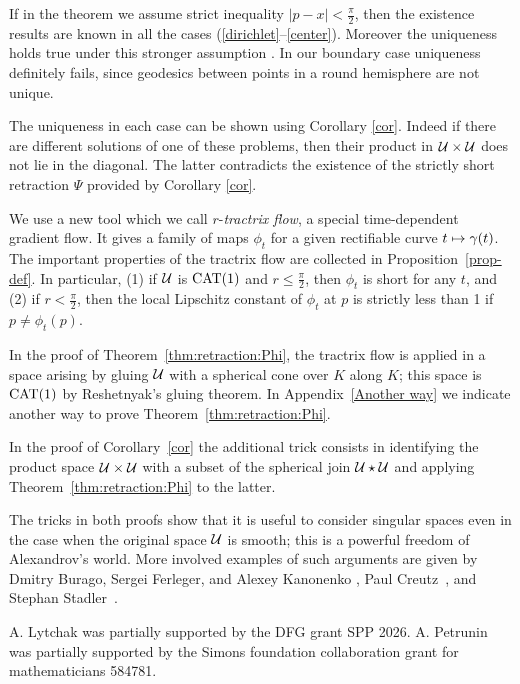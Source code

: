 \documentclass[oneside,a4paper, 12pt]{article}
\begin{document}
If in the theorem we assume strict inequality $|p-x|< \tfrac\pi2$, then the existence results are known  in all the cases (\ref{dirichlet}--\ref{center}).
Moreover the uniqueness holds true under this stronger assumption
\cite{yokota,serbinowski}.
In our boundary case uniqueness definitely fails, since geodesics between points in a round hemisphere are not unique.

The uniqueness in each case can be shown using Corollary \ref{cor}.
Indeed if there are different solutions of one of these problems, then their product in ${\mathcal{U}}\times {\mathcal{U}}$ does not lie in the diagonal.
The latter contradicts the existence of the strictly short retraction $\Psi$ provided by Corollary \ref{cor}.

We use a new tool which we call $r$-\emph{tractrix flow}, a special  time-dependent gradient flow.
It gives a family of maps $\phi_t$ for a given rectifiable curve $t\z\mapsto\gamma(t)$.
The important properties of the tractrix flow are collected in Proposition~\ref{prop-def}.
In particular, (1) if $\mathcal{U}$ is $\mathrm{CAT}(1)$ and $r\le \tfrac\pi2$, then $\phi_t$ is short for any $t$, 
and (2) if $r< \tfrac\pi2$, then the local Lipschitz constant of $\phi_t$ at $p$ is strictly less than 1 if $p\ne \phi_t(p)$.

In the proof of Theorem~\ref{thm:retraction:Phi}, the tractrix flow is applied in a space arising by gluing $\mathcal{U}$ with a spherical cone over $K$ along $K$;
this space is $\mathrm{CAT}(1)$ by Reshetnyak's gluing theorem.
In Appendix~\ref{Another way} we indicate another way to prove Theorem~\ref{thm:retraction:Phi}.

In the proof of Corollary~\ref{cor} the additional trick consists in identifying the product space $\spc{U}\z\times \spc{U}$ with a subset of the spherical join $\mathcal{U}\star \mathcal{U}$ and applying Theorem~\ref{thm:retraction:Phi} to the latter.

The tricks in both proofs show that it is useful to consider singular spaces even in the case when the original space $\mathcal{U}$ is smooth;
this is a powerful freedom of Alexandrov's world.
More involved examples of such arguments are given by Dmitry Burago, Sergei Ferleger, and Alexey Kanonenko \cite{BFK}, Paul Creutz~\cite{creutz}, and Stephan Stadler~\cite{stadler}. 

 A. Lytchak was partially supported by the DFG grant SPP 2026.
A. Petrunin was partially supported by the Simons foundation collaboration grant for mathematicians 584781.
\end{document}
